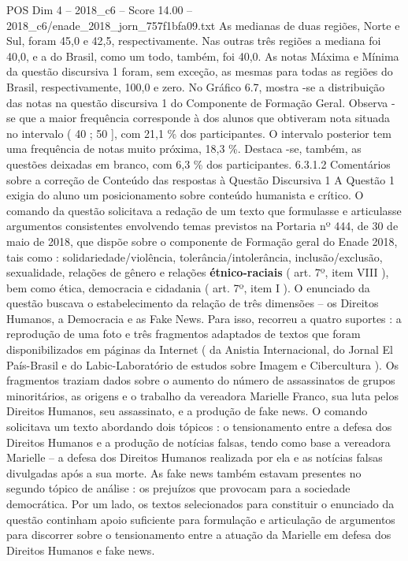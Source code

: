 \begin{textsample}{POS Dim 4 – 2018\_c6 – Score 14.00 – 2018\_c6/enade\_2018\_jorn\_757f1bfa09.txt}
As medianas de duas regiões, Norte e Sul, foram 45,0 e 42,5, respectivamente.
Nas outras três regiões a mediana foi 40,0, e a do Brasil, como um todo, também, foi 40,0.
As notas Máxima e Mínima da questão discursiva 1 foram, sem exceção, as mesmas para todas as regiões do Brasil, respectivamente, 100,0 e zero.
No Gráfico 6.7, mostra -se a distribuição das notas na questão discursiva 1 do Componente de Formação Geral.
Observa -se que a maior frequência corresponde à dos alunos que obtiveram nota situada no intervalo ( 40 ; 50 ], com 21,1 \% dos participantes.
O intervalo posterior tem uma frequência de notas muito próxima, 18,3 \%.
Destaca -se, também, as questões deixadas em branco, com 6,3 \% dos participantes. 6.3.1.2 Comentários sobre a correção de Conteúdo das respostas à Questão Discursiva 1 A Questão 1 exigia do aluno um posicionamento sobre conteúdo humanista e crítico.
O comando da questão solicitava a redação de um texto que formulasse e articulasse argumentos consistentes envolvendo temas previstos na Portaria nº 444, de 30 de maio de 2018, que dispõe sobre o componente de Formação geral do Enade 2018, tais como : solidariedade/violência, tolerância/intolerância, inclusão/exclusão, sexualidade, relações de gênero e relações \textbf{étnico-raciais} ( art. 7º, item VIII ), bem como ética, democracia e cidadania ( art. 7º, item I ).
O enunciado da questão buscava o estabelecimento da relação de três dimensões – os Direitos Humanos, a Democracia e as Fake News.
Para isso, recorreu a quatro suportes : a reprodução de uma foto e três fragmentos adaptados de textos que foram disponibilizados em páginas da Internet ( da Anistia Internacional, do Jornal El País-Brasil e do Labic-Laboratório de estudos sobre Imagem e Cibercultura ).
Os fragmentos traziam dados sobre o aumento do número de assassinatos de grupos minoritários, as origens e o trabalho da vereadora Marielle Franco, sua luta pelos Direitos Humanos, seu assassinato, e a produção de fake news.
O comando solicitava um texto abordando dois tópicos : o tensionamento entre a defesa dos Direitos Humanos e a produção de notícias falsas, tendo como base a vereadora Marielle – a defesa dos Direitos Humanos realizada por ela e as notícias falsas divulgadas após a sua morte.
As fake news também estavam presentes no segundo tópico de análise : os prejuízos que provocam para a sociedade democrática.
Por um lado, os textos selecionados para constituir o enunciado da questão continham apoio suficiente para formulação e articulação de argumentos para discorrer sobre o tensionamento entre a atuação da Marielle em defesa dos Direitos Humanos e fake news.

\end{textsample}
